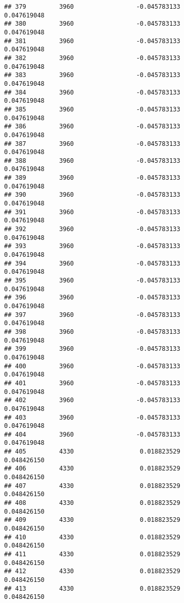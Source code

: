 \documentclass[]{article}
\begin{document}
\begin{verbatim}
## 379         3960                 -0.045783133                0.047619048
## 380         3960                 -0.045783133                0.047619048
## 381         3960                 -0.045783133                0.047619048
## 382         3960                 -0.045783133                0.047619048
## 383         3960                 -0.045783133                0.047619048
## 384         3960                 -0.045783133                0.047619048
## 385         3960                 -0.045783133                0.047619048
## 386         3960                 -0.045783133                0.047619048
## 387         3960                 -0.045783133                0.047619048
## 388         3960                 -0.045783133                0.047619048
## 389         3960                 -0.045783133                0.047619048
## 390         3960                 -0.045783133                0.047619048
## 391         3960                 -0.045783133                0.047619048
## 392         3960                 -0.045783133                0.047619048
## 393         3960                 -0.045783133                0.047619048
## 394         3960                 -0.045783133                0.047619048
## 395         3960                 -0.045783133                0.047619048
## 396         3960                 -0.045783133                0.047619048
## 397         3960                 -0.045783133                0.047619048
## 398         3960                 -0.045783133                0.047619048
## 399         3960                 -0.045783133                0.047619048
## 400         3960                 -0.045783133                0.047619048
## 401         3960                 -0.045783133                0.047619048
## 402         3960                 -0.045783133                0.047619048
## 403         3960                 -0.045783133                0.047619048
## 404         3960                 -0.045783133                0.047619048
## 405         4330                  0.018823529                0.048426150
## 406         4330                  0.018823529                0.048426150
## 407         4330                  0.018823529                0.048426150
## 408         4330                  0.018823529                0.048426150
## 409         4330                  0.018823529                0.048426150
## 410         4330                  0.018823529                0.048426150
## 411         4330                  0.018823529                0.048426150
## 412         4330                  0.018823529                0.048426150
## 413         4330                  0.018823529                0.048426150

\end{verbatim}
\end{document}
